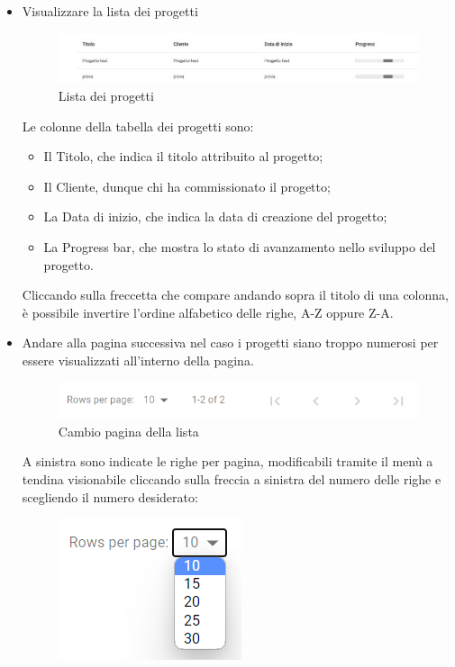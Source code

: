 \documentclass{article}
\begin{document}
\begin{itemize}
\begin{itemize}
    \end{itemize}
    \item Visualizzare la lista dei progetti
    \begin{figure}[H]
      \centering
      \includegraphics[width=\textwidth]{documenti/Screenshot manuale utente/lista prog def.jpeg}
      \caption{Lista dei progetti}
      \label{listaprog}
    \end{figure} 
    Le colonne della tabella dei progetti sono:
    \begin{itemize}
        \item Il Titolo, che indica il titolo attribuito al progetto;
        \item Il Cliente, dunque chi ha commissionato il progetto;
        \item La Data di inizio, che indica la data di creazione del progetto;
        \item La Progress bar, che mostra lo stato di avanzamento nello sviluppo del progetto.
    \end{itemize}
    Cliccando sulla freccetta che compare andando sopra il titolo di una colonna, è possibile invertire l'ordine alfabetico delle righe, A-Z oppure Z-A.
    \item Andare alla pagina successiva nel caso i progetti siano troppo numerosi per essere visualizzati all'interno della pagina. 
    \begin{figure}[H]
      \centering
      \includegraphics[width=\textwidth]{documenti/Screenshot manuale utente/cambio pagina.png}
      \caption{Cambio pagina della lista}
      \label{paginalista}
    \end{figure} 
    A sinistra sono indicate le righe per pagina, modificabili tramite il menù a tendina visionabile cliccando sulla freccia a sinistra del numero delle righe e scegliendo il numero desiderato:
        \begin{figure}[H]
      \centering
      \includegraphics{documenti/Screenshot manuale utente/scelta righe per pagina.png}

\end{figure}
\end{itemize}
\end{document}
